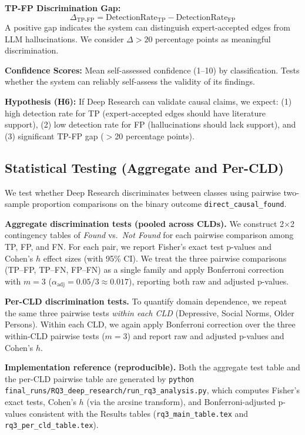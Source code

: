 \textbf{TP-FP Discrimination Gap:}
\[
\Delta_{\text{TP-FP}} = \text{DetectionRate}_{\text{TP}} - \text{DetectionRate}_{\text{FP}}
\]
A positive gap indicates the system can distinguish expert-accepted edges from LLM hallucinations. We consider $\Delta > 20$ percentage points as meaningful discrimination.

\textbf{Confidence Scores:} Mean self-assessed confidence (1--10) by classification. Tests whether the system can reliably self-assess the validity of its findings.

\textbf{Hypothesis (H6):} If Deep Research can validate causal claims, we expect: (1) high detection rate for TP (expert-accepted edges should have literature support), (2) low detection rate for FP (hallucinations should lack support), and (3) significant TP-FP gap ($>$20 percentage points).

\subsection{Statistical Testing (Aggregate and Per-CLD)}

We test whether Deep Research discriminates between classes using pairwise two-sample proportion comparisons on the binary outcome \texttt{direct\_causal\_found}.

\textbf{Aggregate discrimination tests (pooled across CLDs).} We construct 2$\times$2 contingency tables of \textit{Found} vs.\ \textit{Not Found} for each pairwise comparison among TP, FP, and FN. For each pair, we report Fisher's exact test p-values and Cohen's $h$ effect sizes (with 95\% CI). We treat the three pairwise comparisons (TP--FP, TP--FN, FP--FN) as a single family and apply Bonferroni correction with $m=3$ ($\alpha_{\text{adj}}=0.05/3 \approx 0.017$), reporting both raw and adjusted p-values.

\textbf{Per-CLD discrimination tests.} To quantify domain dependence, we repeat the same three pairwise tests \textit{within each CLD} (Depressive, Social Norms, Older Persons). Within each CLD, we again apply Bonferroni correction over the three within-CLD pairwise tests ($m=3$) and report raw and adjusted p-values and Cohen's $h$.

\textbf{Implementation reference (reproducible).} Both the aggregate test table and the per-CLD pairwise table are generated by \texttt{python final\_runs/RQ3\_deep\_research/run\_rq3\_analysis.py}, which computes Fisher's exact tests, Cohen's $h$ (via the arcsine transform), and Bonferroni-adjusted p-values consistent with the Results tables (\texttt{rq3\_main\_table.tex} and \texttt{rq3\_per\_cld\_table.tex}).


